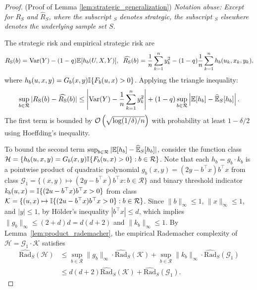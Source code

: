 \begin{proof}(Proof of Lemma \ref{lem:strategic_generalization})\label{proof:strategic_generalization}\label{app:proof_strategic_generalization}
\textit{Notation abuse: Except for $R_S$ and $\widehat{R}_S$, where the subscript $_S$ denotes \emph{strategic}, the subscript $_S$ elsewhere denotes the underlying sample set $S$.}

\noindent The strategic risk and empirical strategic risk are
\begin{equation*}
    R_{\mathrm{S}}(b) = \mathrm{Var}(Y) - (1 - q)\mathbb{E}[h_b(U, X, Y)], \;\; \widehat{R_{\mathrm{S}}}(b) = \frac{1}{n}\sum_{k=1}^n y_k^2 - (1 - q)\frac{1}{n}\sum_{k=1}^n h_b(u_k, x_k, y_k),
\end{equation*}
where $h_b(u, x, y) = G_b(x, y)\mathbb{I}\{F_b(u, x) > 0\}$. Applying the triangle inequality:
\begin{equation*}
    \sup_{b \in \mathcal{R}} |R_{\mathrm{S}}(b) - \widehat{R_{\mathrm{S}}}(b)| \le \left| \mathrm{Var}(Y) - \frac{1}{n}\sum_{k=1}^n y_k^2 \right| + (1-q) \sup_{b \in \mathcal{R}} \left|\mathbb{E}[h_b] - \widehat{\mathbb{E}}_S[h_b]\right|.
\end{equation*}
The first term is bounded by $\mathcal{O}\left(\sqrt{\log(1/\delta)/n}\right)$ with probability at least $1 - \delta/2$ using Hoeffding's inequality.

To bound the second term $\sup_{b \in \mathcal{R}} |\mathbb{E}[h_b] - \widehat{\mathbb{E}}_S[h_b]|$, consider the function class $\mathcal{H} = \{ h_b(u, x, y) = G_b(x, y)\mathbb{I}\{F_b(u, x) > 0\} : b \in \mathcal{R} \}$. Note that each $h_b = g_b \cdot k_b$ is a pointwise product of quadratic polynomial $g_b(x, y) = (2y - b^\top x)b^\top x$ from class $\mathcal{G}_1 = \{ (x,y) \mapsto (2y - b^\top x)b^\top x : b \in \mathcal{R} \}$ and binary threshold indicator $k_b(u, x) = \mathbb{I}\{(2u - b^\top x)b^\top x > 0\}$ from class $\mathcal{K} = \{ (u,x) \mapsto \mathbb{I}\{(2u - b^\top x)b^\top x > 0\} : b \in \mathcal{R} \}$. Since $\|b\|_\infty \le 1$, $\|x\|_\infty \le 1$, and $|y| \le 1$, by Hölder's inequality $|b^\top x| \le d$, which implies $\|g_b\|_\infty \le (2 + d)d = d(d+2)$ and $\|k_b\|_\infty \le 1$. By Lemma~\ref{lem:product_rademacher}, the empirical Rademacher complexity of $\mathcal{H} = \mathcal{G}_1 \cdot \mathcal{K}$ satisfies
\begin{equation*}
    \begin{aligned}
    \widehat{\mathrm{Rad}}_S(\mathcal{H}) &\le \sup_{b \in \mathcal{R}} \|g_b\|_\infty \cdot \widehat{\mathrm{Rad}}_S(\mathcal{K}) + \sup_{b \in \mathcal{R}} \|k_b\|_\infty \cdot \widehat{\mathrm{Rad}}_S(\mathcal{G}_1) \\
    &\le d(d+2) \widehat{\mathrm{Rad}}_S(\mathcal{K}) + \widehat{\mathrm{Rad}}_S(\mathcal{G}_1).
    \end{aligned}
\end{equation*}


\end{proof}
